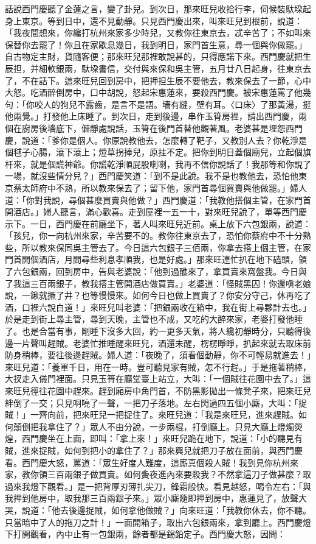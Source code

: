 \begin{showcontents}{}
話說西門慶聽了金蓮之言，變了卦兒。到次日，那來旺兒收拾行李，伺候裝馱垜起身上東京。等到日中，還不見動靜。只見西門慶出來，叫來旺兒到根前，說道：「我夜間想來，你纔打杭州來家多少時兒，又教你往東京去，忒辛苦了；不如叫來保替你去罷了！你且在家歇息幾日，我到明日，家門首生意，尋一個與你做罷。」自古物定主財，貨隨客便；那來旺兒那裡敢說甚的，只得應諾下來。西門慶就把生辰担，并細軟銀兩，馱垜書信，交付與來保和吳主管，五月廿八日起身，往東京去了，不在話下。這來旺兒回到房中，把押担生辰不要他去，教來保去了一節，心中大怒。吃酒醉倒房中，口中胡說，怒起宋惠蓮來，要殺西門慶。被宋惠蓮罵了他幾句：「你咬人的狗兒不露齒，是言不是語。墻有縫，壁有耳。〈口床〉了那黃湯，挺他兩覺。」打發他上床睡了。到次日，走到後邊，串作玉筲房裡，請出西門慶，兩個在廚房後墻底下，僻靜處說話，玉筲在後門首替他觀著風。老婆甚是埋怨西門慶，說道：「爹你是個人。你原說教他去，怎麼轉了靶子，又教別人去？你乾淨是個毬子心腸，滾下滾上；燈草拐捧兒，原拄不定。把你到明日蓋個廟兒，立起個旗杆來，就是個謊神爺。你謊乾淨順屁股喇喇，我再不信你說話了！我那等和你說了一場，就沒些情分兒？」西門慶笑道：「到不是此說。我不是也教他去，恐怕他東京蔡太師府中不熟，所以教來保去了；留下他，家門首尋個買賣與他做罷。」婦人道：「你對我說，尋個甚麼買賣與他做？」西門慶道：「我教他搭個主管，在家門首開酒店。」婦人聽言，滿心歡喜。走到屋裡一五一十，對來旺兒說了，單等西門慶示下。一日，西門慶在前廳坐下，著人叫來旺兒近前。桌上放下六包銀兩，說道：「孩兒，你一向杭州來家，辛苦要不的。教你往東京去了，恐怕你蔡府中不十分熟些，所以教來保同吳主管去了。今日這六包銀子三佰兩，你拿去搭上個主管，在家門首開個酒店，月間尋些利息孝順我，也是好處。」那來旺連忙扒在地下磕頭，領了六包銀兩，回到房中，告與老婆說：「他到過醮來了，拿買賣來窩盤我。今日與了我這三百兩銀子，教我搭主管開酒店做買賣。」老婆道：「怪賊黑囚！你還嗔老娘說，一鍬就撅了井？也等慢慢來。如何今日也做上買賣了？你安分守己，休再吃了酒，口裡六說白道！」來旺兒叫老婆：「把銀兩收在箱中，我在街上尋夥計去也。」於是走到街上尋主管，尋到天晚，主管也不成，又吃的大醉來家，老婆打發他睡了。也是合當有事，剛睡下沒多大回，約一更多天氣，將人纔初靜時分，只聽得後邊一片聲叫趕賊。老婆忙推睡醒來旺兒，酒還未醒，楞楞睜睜，扒起來就去取床前防身稍棒，要往後邊趕賊。婦人道：「夜晚了，須看個動靜，你不可輕易就進去！」來旺兒道：「養軍千日，用在一時。豈可聽見家有賊，怎不行趕。」于是拖著稍棒，大扠走入儀門裡面。只見玉筲在廳堂臺上站立，大叫：「一個賊往花園中去了。」這來旺兒徑往花園中趕來。趕到廂房中角門首，不防黑影拋出一條凳子來，把來旺兒絆倒了一交；只見哃喨了一聲，一把刀子落地。左右閃過四五個小廝，大叫：「捉賊！」一齊向前，把來旺兒一把捉住了。來旺兒道：「我是來旺兒，進來趕賊。如何顛倒把我拿住了？」眾人不由分說，一步兩棍，打倒廳上。只見大廳上燈燭熒煌，西門慶坐在上面，即叫：「拿上來！」來旺兒跪在地下，說道：「小的聽見有賊，進來捉賊，如何到把小的拿住了？」那來興兒就把刀子放在面前，與西門慶看。西門慶大怒，罵道：「眾生好度人難度，這廝真個殺人賊！我到見你杭州來家，教你領三百兩銀子做買賣。如何夤夜進內來要殺我？不然拿這刀子做甚麼？取過來我燈下觀看。」是一把背厚刃薄扎尖刀，鋒霜般快。看見越怒，喝令左右：「與我押到他房中，取我那三百兩銀子來。」眾小廝隨即押到房中，惠蓮見了，放聲大哭，說道：「他去後邊捉賊，如何拿他做賊？」向來旺道：「我教你休去，你不聽。只當暗中了人的拖刀之計！」一面開箱子，取出六包銀兩來，拿到廳上。西門慶燈下打開觀看，內中止有一包銀兩，餘者都是錫鉛定子。西門慶大怒，因問：
\end{showcontents}
